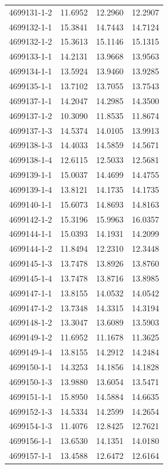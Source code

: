 \begin{longtable}{lrrr}
4699131-1-2 & 11.6952 & 12.2960 & 12.2907 \\
4699132-1-1 & 15.3841 & 14.7443 & 14.7124 \\
4699132-1-2 & 15.3613 & 15.1146 & 15.1315 \\
4699133-1-1 & 14.2131 & 13.9668 & 13.9563 \\
4699134-1-1 & 13.5924 & 13.9460 & 13.9285 \\
4699135-1-1 & 13.7102 & 13.7055 & 13.7543 \\
4699137-1-1 & 14.2047 & 14.2985 & 14.3500 \\
4699137-1-2 & 10.3090 & 11.8535 & 11.8674 \\
4699137-1-3 & 14.5374 & 14.0105 & 13.9913 \\
4699138-1-3 & 14.4033 & 14.5859 & 14.5671 \\
4699138-1-4 & 12.6115 & 12.5033 & 12.5681 \\
4699139-1-1 & 15.0037 & 14.4699 & 14.4755 \\
4699139-1-4 & 13.8121 & 14.1735 & 14.1735 \\
4699140-1-1 & 15.6073 & 14.8693 & 14.8163 \\
4699142-1-2 & 15.3196 & 15.9963 & 16.0357 \\
4699144-1-1 & 15.0393 & 14.1931 & 14.2099 \\
4699144-1-2 & 11.8494 & 12.2310 & 12.3448 \\
4699145-1-3 & 13.7478 & 13.8926 & 13.8760 \\
4699145-1-4 & 13.7478 & 13.8716 & 13.8985 \\
4699147-1-1 & 13.8155 & 14.0532 & 14.0542 \\
4699147-1-2 & 13.7348 & 14.3315 & 14.3194 \\
4699148-1-2 & 13.3047 & 13.6089 & 13.5903 \\
4699149-1-2 & 11.6952 & 11.1678 & 11.3625 \\
4699149-1-4 & 13.8155 & 14.2912 & 14.2484 \\
4699150-1-1 & 14.3253 & 14.1856 & 14.1828 \\
4699150-1-3 & 13.9880 & 13.6054 & 13.5471 \\
4699151-1-1 & 15.8950 & 14.5884 & 14.6635 \\
4699152-1-3 & 14.5334 & 14.2599 & 14.2654 \\
4699154-1-3 & 11.4076 & 12.8425 & 12.7621 \\
4699156-1-1 & 13.6530 & 14.1351 & 14.0180 \\
4699157-1-1 & 13.4588 & 12.6472 & 12.6164 \\

\end{longtable}
